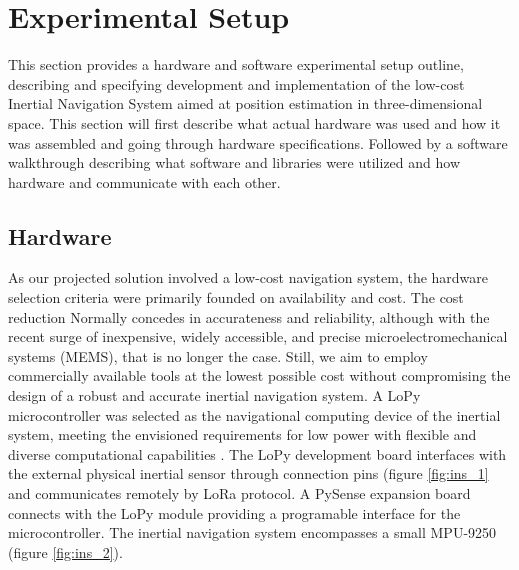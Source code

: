 \section{Experimental Setup}

This section provides a hardware and software experimental setup outline, describing and specifying development and implementation of the low-cost Inertial Navigation System aimed at position estimation in three-dimensional space. This section will first describe what actual hardware was used and how it was assembled and going through hardware specifications. Followed by a software walkthrough describing what software and libraries were utilized and how hardware and communicate with each other.

\subsection{Hardware}
\label{sub:setup}

As our projected solution involved a low-cost navigation system, the hardware selection criteria were primarily founded on availability and cost. The cost reduction Normally concedes in accurateness and reliability, although with the recent surge of inexpensive, widely accessible, and precise microelectromechanical systems (MEMS), that is no longer the case. Still, we aim to employ commercially available tools at the lowest possible cost without compromising the design of a robust and accurate inertial navigation system. A LoPy microcontroller was selected as the navigational computing device of the inertial system, meeting the envisioned requirements for low power with flexible and diverse computational capabilities \cite{lopy}. The LoPy development board interfaces with the external physical inertial sensor through connection pins (figure \ref{fig:ins_1} and communicates remotely by LoRa protocol. A PySense expansion board connects with the LoPy module providing a programable interface for the microcontroller. The inertial navigation system encompasses a small MPU-9250 (figure \ref{fig:ins_2}).

